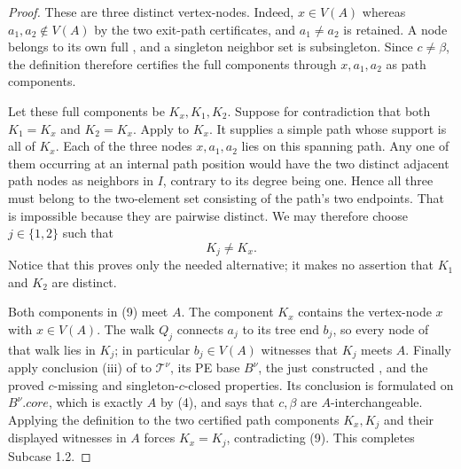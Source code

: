 \begin{proof}
These are three distinct vertex-nodes.  Indeed, $x\in V(A)$ whereas
$a_1,a_2\notin V(A)$ by the two exit-path certificates, and
$a_1\ne a_2$ is retained.  A node belongs to its own full
, and a singleton neighbor set is
subsingleton.  Since $c\ne\beta$, the definition
 therefore certifies the full components
through $x,a_1,a_2$ as path components.

Let these full components be $K_x,K_1,K_2$.  Suppose for contradiction
that both $K_1=K_x$ and $K_2=K_x$.  Apply
 to $K_x$.  It supplies a simple
path whose support is all of $K_x$.  Each of the three nodes
$x,a_1,a_2$ lies on this spanning path.  Any one of them occurring at an
internal path position would have the two distinct adjacent path nodes as
neighbors in $I$, contrary to its degree being one.  Hence all three must
belong to the two-element set consisting of the path's two endpoints.
That is impossible because they are pairwise distinct.  We may therefore
choose $j\in\{1,2\}$ such that
\[
                              K_j\ne K_x.                       \tag{9}
\]
Notice that this proves only the needed alternative; it makes no assertion
that $K_1$ and $K_2$ are distinct.

Both components in (9) meet $A$.  The component $K_x$ contains the
vertex-node $x$ with $x\in V(A)$.  The walk $Q_j$ connects $a_j$ to its
tree end $b_j$, so every node of that walk lies in $K_j$; in particular
$b_j\in V(A)$ witnesses that $K_j$ meets $A$.  Finally apply conclusion
(iii) of  to $\mathcal T^\nu$, its PE base $B^\nu$,
the just constructed , and the proved
$c$-missing and singleton-$c$-closed properties.  Its conclusion is
formulated on $B^\nu.\mathit{core}$, which is exactly $A$ by (4), and
says that $c,\beta$ are $A$-interchangeable.  Applying the definition
 to the two certified path components
$K_x,K_j$ and their displayed witnesses in $A$ forces $K_x=K_j$,
contradicting (9).  This completes Subcase 1.2.
\end{proof}
